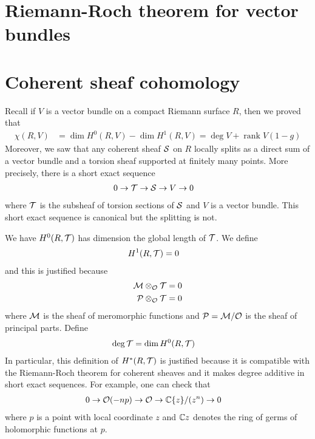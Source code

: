 \documentclass[12pt]{article}
\begin{document}
\section{Riemann-Roch theorem for vector bundles}

\section{Coherent sheaf cohomology}

Recall if $V$ is a vector bundle on a compact Riemann surface $R$, then we proved that \begin{align*}
    \chi(R,V) & = \dim H^0(R,V) - \dim H^1(R,V) = \deg V + \operatorname{rank} V (1-g)
\end{align*} Moreover, we saw that any coherent sheaf ${\mathcal{S}}$ on $R$ locally splits as a direct sum of a vector bundle and a torsion sheaf supported at finitely many points. More precisely, there is a short exact sequence \begin{align*}
    0 \to {\mathcal{T}} & \to {\mathcal{S}} \to V \to 0
\end{align*} where ${\mathcal{T}}$ is the subsheaf of torsion sections of ${\mathcal{S}}$ and $V$ is a vector bundle. This short exact sequence is canonical but the splitting is not. 

We have $H^0(R,{\mathcal{T}})$ has dimension the global length of ${\mathcal{T}}$. We define \begin{align*}
    H^1(R,{\mathcal{T}}) & = 0
\end{align*} and this is justified because \begin{align*}
    {\mathcal{M}} \otimes_{{\mathcal{O}}} {\mathcal{T}} & = 0 \\
    {\mathcal{P}} \otimes_{{\mathcal{O}}} {\mathcal{T}} & = 0
\end{align*} where ${\mathcal{M}}$ is the sheaf of meromorphic functions and ${\mathcal{P}} = {\mathcal{M}}/{\mathcal{O}}$ is the sheaf of principal parts. Define \begin{align*}
    \deg {\mathcal{T}} & = \dim H^0(R,{\mathcal{T}})
\end{align*} In particular, this definition of $H^*(R,{\mathcal{T}})$ is justified because it is compatible with the Riemann-Roch theorem for coherent sheaves and it makes degree additive in short exact sequences. For example, one can check that \begin{align*}
    0 \to {\mathcal{O}}(-np) \to {\mathcal{O}} & \to \mathbb{C}\{z\}/(z^n) \to 0
\end{align*} where $p$ is a point with local coordinate $z$ and $\mathbb{C}{z}$ denotes the ring of germs of holomorphic functions at $p$. 
\end{document}
